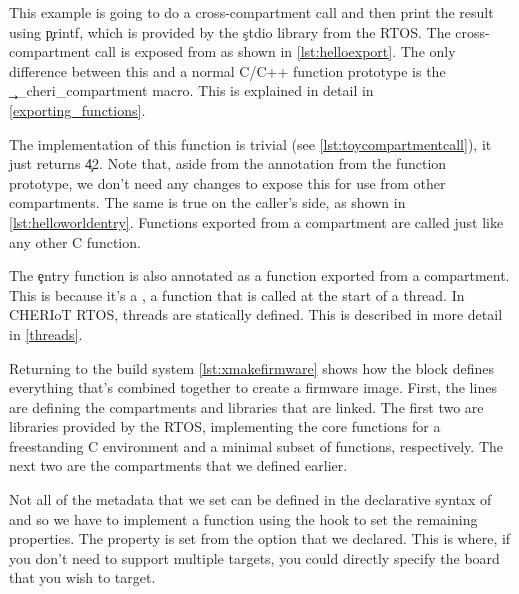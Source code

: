 This example is going to do a cross-compartment call and then print the result using \c{printf}, which is provided by the \c{stdio} library from the RTOS.
The cross-compartment call is exposed from  as shown in \ref{lst:helloexport}.
The only difference between this and a normal C/C++ function prototype is the \c{__cheri_compartment} macro.
This is explained in detail in \ref{exporting_functions}.

\codelisting[filename=examples/hello_world/hello.h,marker=export,label=lst:helloexport,caption="Exporting a function for use by other compartments"]{}

The implementation of this function is trivial (see \ref{lst:toycompartmentcall}), it just returns \c{42}.
Note that, aside from the annotation from the function prototype, we don't need any changes to expose this for use from other compartments.
The same is true on the caller's side, as shown in \ref{lst:helloworldentry}.
Functions exported from a compartment are called just like any other C function.

\codelisting[filename=examples/hello_world/compartment.cc,marker=all,label=lst:toycompartmentcall,caption="A trivial implementation of an exported function"]{}

\codelisting[filename=examples/hello_world/hello.cc,marker=entry,label=lst:helloworldentry,caption="A simple compartment entry point that does a cross-compartment call"]{}

The \c{entry} function is also annotated as a function exported from a compartment.
This is because it's a , a function that is called at the start of a thread.
In CHERIoT RTOS, threads are statically defined.
This is described in more detail in \ref{threads}.

Returning to the build system \ref{lst:xmakefirmware} shows how the  block defines everything that's combined together to create a firmware image.
First, the  lines are defining the compartments and libraries that are linked.
The first two are libraries provided by the RTOS, implementing the core functions for a freestanding C environment and a minimal subset of  functions, respectively.
The next two are the compartments that we defined earlier.

Not all of the metadata that we set can be defined in the declarative syntax of  and so we have to implement a function using the  hook to set the remaining properties.
The  property is set from the option that we declared.
This is where, if you don't need to support multiple targets, you could directly specify the board that you wish to target.

